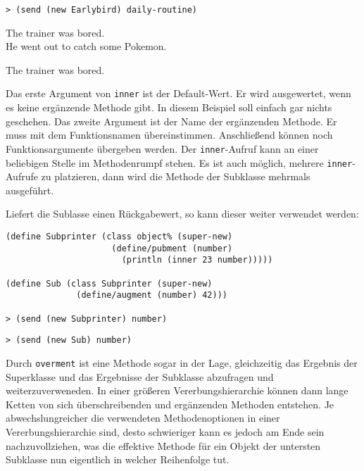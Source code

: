 \begin{lstlisting}                
> (send (new Earlybird) daily-routine)
\end{lstlisting}
{\routput The trainer was bored.}\\
{\routput He went out to catch some Pokemon.}

{\routput The trainer was bored.}

Das erste Argument von \texttt{inner} ist der Default-Wert. Er wird ausgewertet, wenn es keine ergänzende Methode gibt. In diesem Beispiel soll einfach gar nichts geschehen. Das zweite Argument ist der Name der ergänzenden Methode. Er muss mit dem Funktionsnamen übereinstimmen. Anschließend können noch Funktionsargumente übergeben werden. Der \texttt{inner}-Aufruf kann an einer beliebigen Stelle im Methodenrumpf stehen. Es ist auch möglich, mehrere \texttt{inner}-Aufrufe zu platzieren, dann wird die Methode der Subklasse mehrmals ausgeführt. 

Liefert die Sublasse einen Rückgabewert, so kann dieser weiter verwendet werden:

\begin{lstlisting}
(define Subprinter (class object% (super-new)
                     (define/pubment (number)
                       (println (inner 23 number)))))

(define Sub (class Subprinter (super-new)
              (define/augment (number) 42)))

> (send (new Subprinter) number)
\end{lstlisting}
{}

\begin{lstlisting}
> (send (new Sub) number)
\end{lstlisting}
{}

Durch \texttt{overment} ist eine Methode sogar in der Lage, gleichzeitig das Ergebnis der Superklasse und das Ergebnisse der Subklasse abzufragen und weiterzuverweneden. In einer größeren Vererbungshierarchie können dann lange Ketten von sich überschreibenden und ergänzenden Methoden entstehen. Je abwechslungreicher die verwendeten Methodenoptionen in einer Vererbungshierarchie sind, desto schwieriger kann es jedoch am Ende sein nachzuvollziehen, was die effektive Methode für ein Objekt der untersten Subklasse nun eigentlich in welcher Reihenfolge tut.



